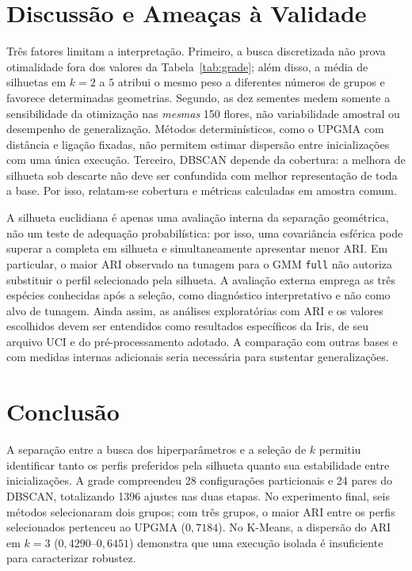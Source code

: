 \documentclass[conference,a4paper]{IEEEtran}
\begin{document}
\section{Discussão e Ameaças à Validade}
Três fatores limitam a interpretação. Primeiro, a busca discretizada não prova otimalidade fora dos valores da Tabela~\ref{tab:grade}; além disso, a média de silhuetas em $k=2$ a $5$ atribui o mesmo peso a diferentes números de grupos e favorece determinadas geometrias. Segundo, as dez sementes medem somente a sensibilidade da otimização nas \emph{mesmas} 150 flores, não variabilidade amostral ou desempenho de generalização. Métodos determinísticos, como o UPGMA com distância e ligação fixadas, não permitem estimar dispersão entre inicializações com uma única execução. Terceiro, DBSCAN depende da cobertura: a melhora de silhueta sob descarte não deve ser confundida com melhor representação de toda a base. Por isso, relatam-se cobertura e métricas calculadas em amostra comum.

A silhueta euclidiana é apenas uma avaliação interna da separação geométrica, não um teste de adequação probabilística: por isso, uma covariância esférica pode superar a completa em silhueta e simultaneamente apresentar menor ARI. Em particular, o maior ARI observado na tunagem para o GMM \texttt{full} não autoriza substituir o perfil selecionado pela silhueta. A avaliação externa emprega as três espécies conhecidas após a seleção, como diagnóstico interpretativo e não como alvo de tunagem. Ainda assim, as análises exploratórias com ARI e os valores escolhidos devem ser entendidos como resultados específicos da Iris, de seu arquivo UCI e do pré-processamento adotado. A comparação com outras bases e com medidas internas adicionais seria necessária para sustentar generalizações.

\section{Conclusão}
A separação entre a busca dos hiperparâmetros e a seleção de $k$ permitiu identificar tanto os perfis preferidos pela silhueta quanto sua estabilidade entre inicializações. A grade compreendeu 28 configurações particionais e 24 pares do DBSCAN, totalizando 1396 ajustes nas duas etapas. No experimento final, seis métodos selecionaram dois grupos; com três grupos, o maior ARI entre os perfis selecionados pertenceu ao UPGMA ($0{,}7184$). No K-Means, a dispersão do ARI em $k=3$ ($0{,}4290$--$0{,}6451$) demonstra que uma execução isolada é insuficiente para caracterizar robustez.
\end{document}
